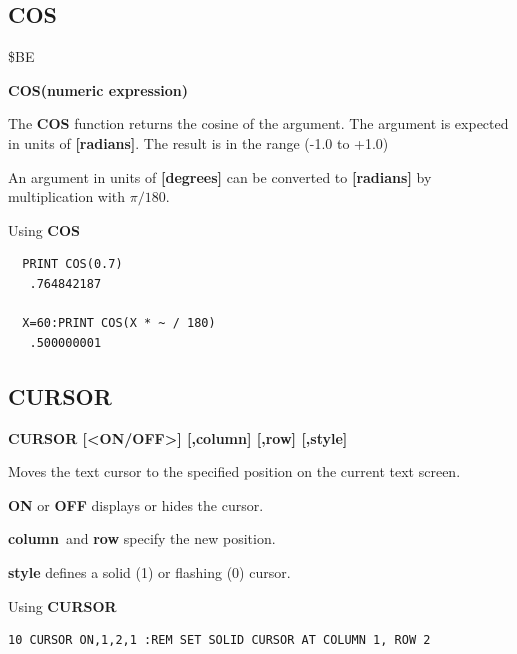 
\newpage
\subsection{COS}
\begin{description}[leftmargin=2cm,style=nextline]
\item [Token:] \$BE
\item [Format:] {\bf COS(numeric expression)}
\item [Usage:] The {\bf COS} function returns the cosine of the
               argument.
               The argument is expected in units of {\bf [radians]}.
               The result is in the range (-1.0 to +1.0)

\item [Remarks:] An argument in units of {\bf [degrees]}
                 can be converted to {\bf [radians]}
               by multiplication with $\pi/180$.
\item [Example:] Using {\bf COS}
\begin{tcolorbox}[colback=black,coltext=white]
\verbatimfont{\codefont}
\begin{verbatim}
  PRINT COS(0.7)
   .764842187

  X=60:PRINT COS(X * ~ / 180)
   .500000001
\end{verbatim}
\end{tcolorbox}
\end{description}


\newpage
\subsection{CURSOR}
\begin{description}[leftmargin=2cm,style=nextline]
\item [Format:] {\bf CURSOR [<ON/OFF>] [,column] [,row] [,style]}
\item [Usage:] Moves the text cursor to
               the specified position on the current text screen.

               {\bf ON} or {\bf OFF} displays or hides the cursor.

               {\bf column} and {\bf row} specify the new position.

               {\bf style} defines a solid (1) or flashing (0) cursor.

\item [Example:] Using {\bf CURSOR}
\begin{tcolorbox}[colback=black,coltext=white]
\verbatimfont{\codefont}
\begin{verbatim}
10 CURSOR ON,1,2,1 :REM SET SOLID CURSOR AT COLUMN 1, ROW 2
\end{verbatim}
\end{tcolorbox}
\end{description}

